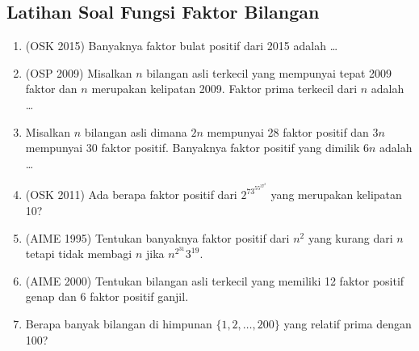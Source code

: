 \subsection{Latihan Soal Fungsi Faktor Bilangan}
\begin{enumerate}
    \item (OSK 2015) Banyaknya faktor bulat positif dari 2015 adalah \ldots

    \item (OSP 2009) Misalkan $n$ bilangan asli terkecil yang mempunyai tepat 2009 faktor dan $n$ merupakan kelipatan 2009. Faktor prima terkecil dari $n$ adalah \dots
    
    \item Misalkan $n$ bilangan asli dimana $2n$ mempunyai 28 faktor positif dan $3n$ mempunyai 30 faktor positif. Banyaknya faktor positif yang dimilik $6n$ adalah \dots
    
    \item (OSK 2011) Ada berapa faktor positif dari $2^73^55^37^2$ yang merupakan kelipatan 10?
    
    \item (AIME 1995) Tentukan banyaknya faktor positif dari $n^2$ yang kurang dari $n$ tetapi tidak membagi $n$ jika $n^{2^{31}}3^{19}.$
    
    \item (AIME 2000) Tentukan bilangan asli terkecil yang memiliki 12 faktor positif genap dan $6$ faktor positif ganjil.

    \item Berapa banyak bilangan di himpunan $\{1,2,\dots,200\}$ yang relatif prima dengan 100?
\end{enumerate}